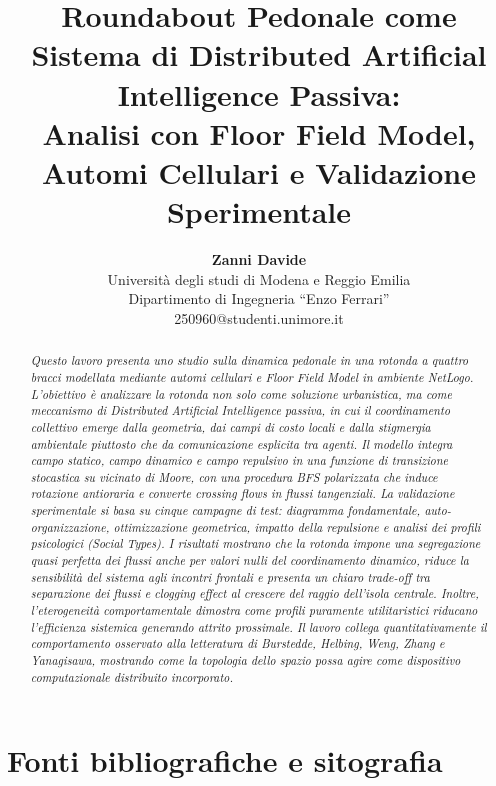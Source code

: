 \documentclass[conference]{IEEEtran}
\title{\textbf{Roundabout Pedonale come Sistema di Distributed Artificial Intelligence Passiva:\\
Analisi con Floor Field Model, Automi Cellulari e Validazione Sperimentale}}
\author{
    \textbf{Zanni Davide}\\
    Università degli studi di Modena e Reggio Emilia\\
    Dipartimento di Ingegneria ``Enzo Ferrari''\\
    250960@studenti.unimore.it
}
\date{}
\begin{document}
\maketitle

\begin{abstract}
\itshape
Questo lavoro presenta uno studio sulla dinamica pedonale in una rotonda a quattro bracci modellata mediante automi cellulari e Floor Field Model in ambiente NetLogo. L'obiettivo è analizzare la rotonda non solo come soluzione urbanistica, ma come meccanismo di \textit{Distributed Artificial Intelligence passiva}, in cui il coordinamento collettivo emerge dalla geometria, dai campi di costo locali e dalla stigmergia ambientale piuttosto che da comunicazione esplicita tra agenti. Il modello integra campo statico, campo dinamico e campo repulsivo in una funzione di transizione stocastica su vicinato di Moore, con una procedura BFS polarizzata che induce rotazione antioraria e converte crossing flows in flussi tangenziali. La validazione sperimentale si basa su cinque campagne di test: diagramma fondamentale, auto-organizzazione, ottimizzazione geometrica, impatto della repulsione e analisi dei profili psicologici (Social Types). I risultati mostrano che la rotonda impone una segregazione quasi perfetta dei flussi anche per valori nulli del coordinamento dinamico, riduce la sensibilità del sistema agli incontri frontali e presenta un chiaro trade-off tra separazione dei flussi e \textit{clogging effect} al crescere del raggio dell'isola centrale. Inoltre, l'eterogeneità comportamentale dimostra come profili puramente utilitaristici riducano l'efficienza sistemica generando attrito prossimale. Il lavoro collega quantitativamente il comportamento osservato alla letteratura di Burstedde, Helbing, Weng, Zhang e Yanagisawa, mostrando come la topologia dello spazio possa agire come dispositivo computazionale distribuito incorporato.
\end{abstract}









\newpage
\section{Fonti bibliografiche e sitografia}


\listoffigures
\listoftables
\end{document}
